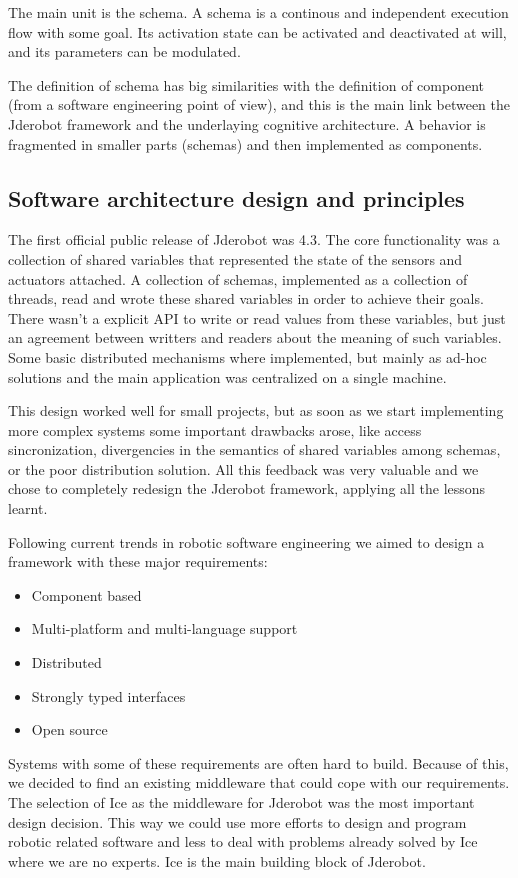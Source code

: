 \documentclass[twocolumn]{svjour3}          %
\begin{document}
The main unit is the schema. A schema is a continous and independent execution flow with some goal. Its activation state can be activated and deactivated at will, and its parameters can be modulated.

The definition of schema has big similarities with the definition of component (from a software engineering point of view), and this is the main link between the Jderobot framework and the underlaying cognitive architecture. A behavior is fragmented in smaller parts (schemas) and then implemented as components.

\subsection{Software architecture design and principles}

The first official public release of Jderobot was 4.3. The core functionality was a collection of shared variables that represented the state of the sensors and actuators attached. A collection of schemas, implemented as a collection of threads, read and wrote these shared variables in order to achieve their goals. There wasn't a explicit API to write or read values from these variables, but just an agreement between writters and readers about the meaning of such variables. Some basic distributed mechanisms where implemented, but mainly as ad-hoc solutions and the main application was centralized on a single machine.

This design worked well for small projects, but as soon as we start implementing more complex systems some important drawbacks arose, like access sincronization, divergencies in the semantics of shared variables among schemas, or the poor distribution solution. All this feedback was very valuable and we chose to completely redesign the Jderobot framework, applying all the lessons learnt.

Following current trends in robotic software engineering we aimed to design a framework with these major requirements:
\begin{itemize}
\item Component based
\item Multi-platform and multi-language support
\item Distributed
\item Strongly typed interfaces
\item Open source
\end{itemize}

Systems with some of these requirements are often hard to build. Because of this, we decided to find an existing middleware that could cope with our requirements. The selection of Ice as the middleware for Jderobot was the most important design decision. This way we could use more efforts to design and program robotic related software and less to deal with problems already solved by Ice where we are no experts. Ice is the main building block of Jderobot.
\end{document}
